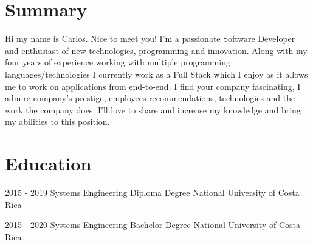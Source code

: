 \documentclass[letterpaper]{twentysecondcv} %
\begin{document}
\makeprofile
\section{Summary}
\small{Hi my name is Carlos. Nice to meet you! I'm a passionate Software Developer and enthusiast of new technologies, programming and innovation. Along with my four years of experience working with multiple programming languages/technologies I currently work as a Full Stack which I enjoy as it allows me to work on applications from end-to-end. I find your company fascinating, I admire company's prestige, employees recommendations, technologies and the work the company does. I'll love to share and increase my knowledge and bring my abilities to this position.

}

\section{Education}

\begin{twenty}
	\twentyitem
    	{2015 - 2019}
        {Systems Engineering Diploma Degree}
        {National University of Costa Rica}
        {}
      
	\twentyitem
    	{2015 - 2020}
        {Systems Engineering Bachelor Degree}
        {National University of Costa Rica}
        {}

\end{twenty}
\end{document}

